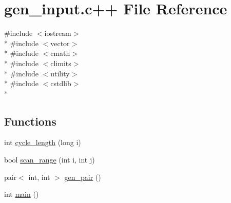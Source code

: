 \hypertarget{gen__input_8c_09_09}{\section{gen\-\_\-input.\-c++ File Reference}
\label{gen__input_8c_09_09}
}
{\ttfamily \#include $<$iostream$>$}\\*
{\ttfamily \#include $<$vector$>$}\\*
{\ttfamily \#include $<$cmath$>$}\\*
{\ttfamily \#include $<$climits$>$}\\*
{\ttfamily \#include $<$utility$>$}\\*
{\ttfamily \#include $<$cstdlib$>$}\\*
\subsection*{Functions}
\begin{DoxyCompactItemize}
\item 
int \hyperlink{gen__input_8c_09_09_a47c4f5d3e657532339f84d16ef18a4d1}{cycle\-\_\-length} (long i)
\item 
bool \hyperlink{gen__input_8c_09_09_aa8f21a2fa5c020e65a65310d76dc7ea1}{scan\-\_\-range} (int i, int j)
\item 
pair$<$ int, int $>$ \hyperlink{gen__input_8c_09_09_a8b46ccaca84348afc8e7d5b40993a897}{gen\-\_\-pair} ()
\item 
int \hyperlink{gen__input_8c_09_09_ae66f6b31b5ad750f1fe042a706a4e3d4}{main} ()
\end{DoxyCompactItemize}


